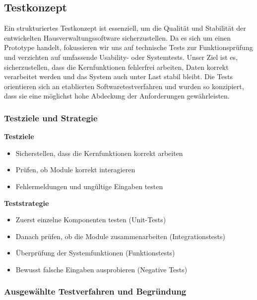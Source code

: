 \newpage
\subsection{Testkonzept}


Ein strukturiertes Testkonzept ist essenziell, um die Qualität und Stabilität der entwickelten Hausverwaltungssoftware sicherzustellen.  
Da es sich um einen Prototype handelt, fokussieren wir uns auf technische Tests zur Funktionsprüfung und verzichten auf umfassende Usability- oder Systemtests.  
Unser Ziel ist es, sicherzustellen, dass die Kernfunktionen fehlerfrei arbeiten, Daten korrekt verarbeitet werden und das System auch unter Last stabil bleibt.  
Die Tests orientieren sich an etablierten Softwaretestverfahren und wurden so konzipiert, dass sie eine möglichst hohe Abdeckung der Anforderungen gewährleisten.

\subsubsection{Testziele und Strategie}

\textbf{Testziele}

\begin{itemize}
	\item Sicherstellen, dass die Kernfunktionen korrekt arbeiten
	\item Prüfen, ob Module korrekt interagieren
	\item Fehlermeldungen und ungültige Eingaben testen
\end{itemize}

\textbf{Teststrategie}

\begin{itemize}
	\item Zuerst einzelne Komponenten testen (Unit-Tests)
	\item Danach prüfen, ob die Module zusammenarbeiten (Integrationstests)
	\item Überprüfung der Systemfunktionen (Funktionstests)
	\item Bewusst falsche Eingaben ausprobieren (Negative Tests)
\end{itemize}

\subsubsection{Ausgewählte Testverfahren und Begründung}

